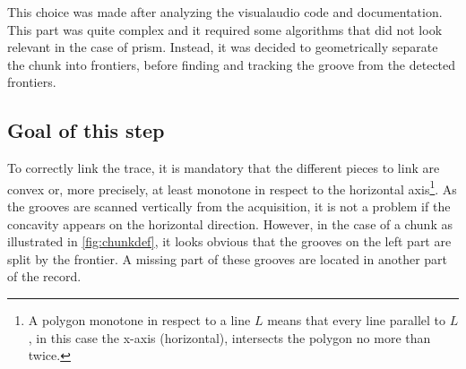 This choice was made after analyzing the \gls{visualaudio} code and documentation. This part was quite complex and it required some algorithms that did not look relevant in the case of \gls{prism}. Instead, it was decided to geometrically separate the chunk into frontiers, before finding and tracking the groove from the detected frontiers.

\subsection{Goal of this step}
\label{chap:linking}

To correctly link the trace, it is mandatory that the different pieces to link are convex or, more precisely, at least monotone in respect to the horizontal axis\footnote{A polygon monotone in respect to a line $L$ means that every line parallel to $L$, in this case the x-axis (horizontal), intersects the polygon no more than twice.}. As the grooves are scanned vertically from the acquisition, it is not a problem if the concavity appears on the horizontal direction. However, in the case of a chunk as illustrated in \autoref{fig:chunkdef}, it looks obvious that the grooves on the left part are split by the frontier. A missing part of these grooves are located in another part of the record.

